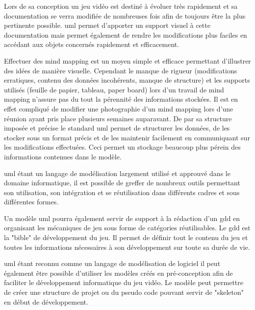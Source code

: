 Lors de sa conception un jeu vidéo est destiné à évoluer très rapidement et sa documentation se verra modifiée de nombreuses fois afin de toujours être la plus pertinente possible. \gls{uml} permet d'apporter un support visuel à cette documentation mais permet également de rendre les modifications plus faciles en accédant aux objets concernés rapidement et efficacement. 

Effectuer des mind mapping est un moyen simple et efficace permettant d'illustrer des idées de manière visuelle. Cependant le manque de rigueur (modifications erratiques, contenu des données incohérents, manque de structure) et les supports utilisés (feuille de papier, tableau, paper board) lors d'un travail de mind mapping n'assure pas du tout la pérennité des informations stockées. Il est en effet compliqué de modifier une photographie d'un mind mapping lors d'une réunion ayant pris place plusieurs semaines auparavant. De par sa structure imposée et précise le standard \gls{uml} permet de structurer les données, de les stocker sous un format précis et de les maintenir facilement en communiquant sur les modifications effectuées. Ceci permet un stockage beaucoup plus pérein des informations contenues dans le modèle.

\gls{uml} étant un langage de modélisation largement utilisé et approuvé dans le domaine informatique, il est possible de greffer de nombreux outils permettant son utilisation, son intégration et se réutilisation dans différents cadres et sous différentes formes.

Un modèle \gls{uml} pourra également servir de support à la rédaction d'un \gls{gdd} en organisant les mécaniques de jeu sous forme de catégories réutilisables. Le \gls{gdd} est la "bible" de développement du jeu. Il permet de définir tout le contenu du jeu et toutes les informations nécessaires à son développement sur toute sa durée de vie. 

\gls{uml} étant reconnu comme un langage de modélisation de logiciel il peut également être possible d'utiliser les modèles créés en pré-conception afin de faciliter le développement informatique du jeu vidéo. Le modèle peut permettre de créer une structure de projet ou du pseudo code pouvant servir de "skeleton" en début de développement.

